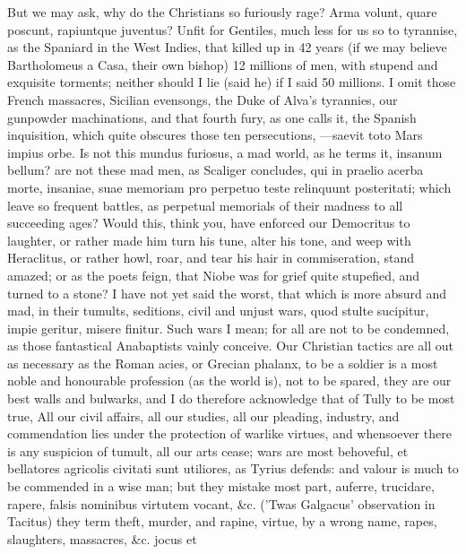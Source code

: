 {But we may ask, why do the Christians so furiously rage? Arma
volunt, quare poscunt, rapiuntque juventus? Unfit for Gentiles, much
less for us so to tyrannise, as the Spaniard in the West Indies, that
killed up in 42 years (if we may believe Bartholomeus a Casa,
their own bishop) 12 millions of men, with stupend and exquisite
torments; neither should I lie (said he) if I said 50 millions. I omit
those French massacres, Sicilian evensongs, the Duke of Alva's
tyrannies, our gunpowder machinations, and that fourth fury, as
one calls it, the Spanish inquisition, which quite obscures those
ten persecutions, ---saevit toto Mars impius orbe. Is not this
mundus furiosus, a mad world, as he terms it, insanum bellum? are
not these mad men, as Scaliger concludes, qui in praelio acerba
morte, insaniae, suae memoriam pro perpetuo teste relinquunt
posteritati; which leave so frequent battles, as perpetual memorials of
their madness to all succeeding ages? Would this, think you, have
enforced our Democritus to laughter, or rather made him turn his tune,
alter his tone, and weep with Heraclitus, or rather howl,
roar, and tear his hair in commiseration, stand amazed; or as the
poets feign, that Niobe was for grief quite stupefied, and turned to a
stone? I have not yet said the worst, that which is more absurd and
mad, in their tumults, seditions, civil and unjust wars, quod
stulte sucipitur, impie geritur, misere finitur. Such wars I mean; for
all are not to be condemned, as those fantastical Anabaptists vainly
conceive. Our Christian tactics are all out as necessary as the Roman
acies, or Grecian phalanx, to be a soldier is a most noble and
honourable profession (as the world is), not to be spared, they are our
best walls and bulwarks, and I do therefore acknowledge that of
Tully to be most true, All our civil affairs, all our studies, all
our pleading, industry, and commendation lies under the protection of
warlike virtues, and whensoever there is any suspicion of tumult, all
our arts cease; wars are most behoveful, et bellatores agricolis
civitati sunt utiliores, as Tyrius defends: and valour is much to
be commended in a wise man; but they mistake most part, auferre,
trucidare, rapere, falsis nominibus virtutem vocant, \&c. ('Twas
Galgacus' observation in Tacitus) they term theft, murder, and rapine,
virtue, by a wrong name, rapes, slaughters, massacres, \&c. jocus et
}
